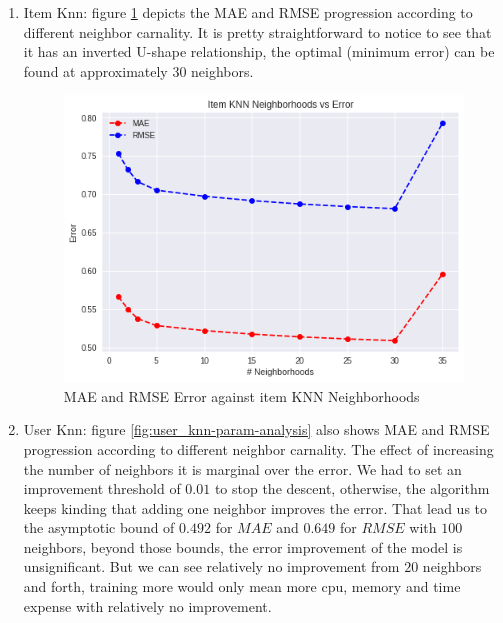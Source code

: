 \documentclass[letterpaper, 10 pt, conference]{ieeeconf}  %
\begin{document}
\begin{enumerate}
    \item Item Knn: figure \ref{fig:item_knn-param-analysis} depicts the MAE and RMSE progression according to different neighbor carnality. It is pretty straightforward to notice to see that it has an inverted U-shape relationship, the optimal (minimum error) can be found at approximately 30 neighbors.
    
    \begin{figure}[h]
        \includegraphics[scale=0.4]{item_knn-param-analysis.png}
        \centering
        \caption{MAE and RMSE Error against item KNN Neighborhoods}
        \label{fig:item_knn-param-analysis}
    \end{figure}
        
    \item User Knn: figure \ref{fig:user_knn-param-analysis} also shows MAE and RMSE progression according to different neighbor carnality. The effect of increasing the number of neighbors it is marginal over the error. We had to set an improvement threshold of $0.01$ to stop the descent, otherwise, the algorithm keeps kinding that adding one neighbor improves the error. That lead us to the asymptotic bound of $0.492$ for $MAE$ and $0.649$ for $RMSE$ with $100$ neighbors, beyond those bounds, the error improvement of the model is unsignificant. But we can see relatively no improvement from $20$ neighbors and forth, training more would only mean more cpu, memory and time expense with relatively no improvement. 
    

\end{enumerate}
\end{document}
